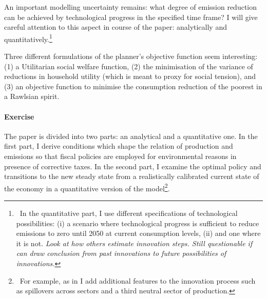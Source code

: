 An important modelling uncertainty remains: what degree of emission reduction can be achieved by technological progress in the specified time frame? I will give careful attention to this aspect in course of the paper: analytically and quantitatively.\footnote{\ In the quantitative part, I use different specifications of technological possibilities: (i) a scenario where technological progress is sufficient to reduce emissions to zero until 2050 at current consumption levels, (ii) and one where it is not. \textit{ Look at how others estimate innovation steps. Still questionable if can draw conclusion from past innovations to future possibilities of innovations. }}


Three different formulations of the planner's objective function seem interesting: (1) a Utilitarian social welfare function, (2) the minimisation of the variance of reductions in household utility (which is meant to proxy for social tension), and (3) an objective function to minimise the consumption reduction of the poorest in a Rawlsian spirit. 


\paragraph{Exercise}
The paper is divided into two parts: an analytical and a quantitative one.
In the first part, I derive  conditions which shape the relation of production and emissions so that fiscal policies are employed for environmental reasons in presence  of corrective taxes.  
In the second part, I examine the optimal policy and transitions to the new steady state from a realistically calibrated current state of the economy in a quantitative version of the model\footnote{\ For example, as in  \cite{Fried2018ClimateAnalysis} I add additional features to the innovation process such as spillovers across sectors and a third neutral sector of production.}.


